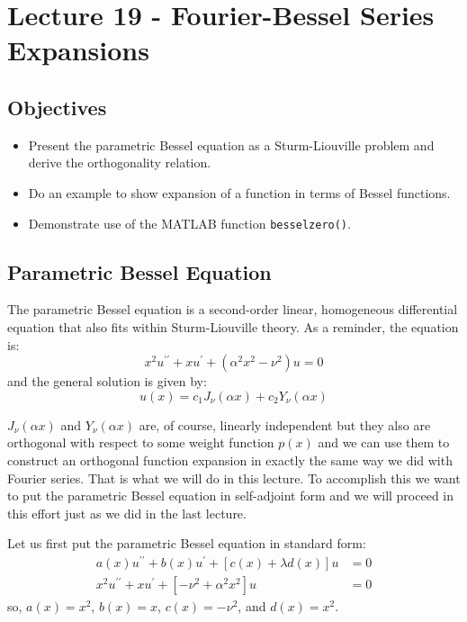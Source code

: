 \chapter{Lecture 19 - Fourier-Bessel Series Expansions}
\label{ch:lec19}
\section{Objectives}
\begin{itemize}
\item Present the parametric Bessel equation as a Sturm-Liouville problem and derive the orthogonality relation.
\item Do an example to show expansion of a function in terms of Bessel functions.
\item Demonstrate use of the MATLAB function \lstinline{besselzero()}.
\end{itemize}

\section{Parametric Bessel Equation}
The parametric Bessel equation is a second-order linear, homogeneous differential equation that also fits within Sturm-Liouville theory.  As a reminder, the equation is:
\begin{equation*}
x^2u^{\prime \prime} + xu^{\prime} + \left(\alpha^2x^2-\nu^2\right)u = 0
\end{equation*}
and the general solution is given by:
\begin{equation*}
u(x) = c_1J_{\nu}(\alpha x) + c_2Y_{\nu}(\alpha x)
\end{equation*}

 $J_{\nu}(\alpha x)$ and $Y_{\nu}(\alpha x)$ are, of course, linearly independent but they also are orthogonal with respect to some weight function $p(x)$ and we can use them to construct an orthogonal function expansion in exactly the same way we did with Fourier series.  That is what we will do in this lecture.  To accomplish this we want to put the parametric Bessel equation in self-adjoint form and we will proceed in this effort just as we did in the last lecture.

\vspace{0.5cm}

\noindent Let us first put the parametric Bessel equation in standard form:
\begin{align*}
a(x)u^{\prime \prime} + b(x)u^{\prime} + \left[c(x)+\lambda d(x) \right] u &= 0 \\
x^2u^{\prime \prime} + xu^{\prime} + \left[-\nu^2 + \alpha^2 x^2\right]u &=0
\end{align*}
so, $a(x) = x^2$, $b(x)=x$, $c(x) = -\nu^2$, and $d(x)=x^2$.

